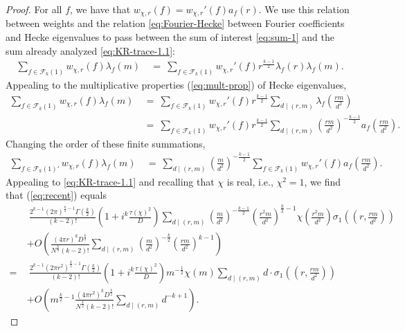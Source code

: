 \documentclass[10pt,a4paper]{amsart}
\begin{document}
\begin{proof}
For all $f$, we have that $w_{\chi,r}(f)=w_{\chi,r}'(f)a_f(r)$. We use this relation between weights and the relation \eqref{eq:Fourier-Hecke} between Fourier coefficients and Hecke eigenvalues to pass between the sum of interest \eqref{eq:sum-1} and the sum already analyzed \eqref{eq:KR-trace-1.1}:
\begin{align}
\sum_{f\in\mathcal{F}_k(1)}w_{\chi,r}(f)\lambda_f(m) \ 
&= \ \sum_{f\in\mathcal{F}_k(1)}w_{\chi,r}'(f)r^{\frac{k-1}{2}}\lambda_f(r)\lambda_f(m).
\end{align}
Appealing to the multiplicative properties (\ref{eq:mult-prop}) of Hecke eigenvalues,
\begin{align}
\sum_{f\in\mathcal{F}_k(1)}w_{\chi,r}(f)\lambda_f(m) \ 
&= \ \sum_{f\in\mathcal{F}_k(1)}w_{\chi,r}'(f)r^{\frac{k-1}{2}}\sum_{d\mid(r,m)}\lambda_f\left(\frac{rm}{d^2}\right) \\
&= \ \sum_{f\in\mathcal{F}_k(1)}w_{\chi,r}'(f)r^{\frac{k-1}{2}}\sum_{d\mid(r,m)}\left(\frac{rm}{d^2}\right)^{-\frac{k-1}{2}}a_f\left(\frac{rm}{d^2}\right).
\end{align}
Changing the order of these finite summations,
\begin{align}
\label{eq:recent}
\sum_{f\in\mathcal{F}_k(1)'}w_{\chi,r}(f)\lambda_f(m) \
&= \ \sum_{d\mid(r,m)} \left(\frac{m}{d^2}\right)^{-\frac{k-1}{2}}\sum_{f\in\mathcal{F}_k(1)}w_{\chi,r}'(f)a_f\left(\frac{rm}{d^2}\right).
\end{align}
Appealing to \eqref{eq:KR-trace-1.1} and recalling that $\chi$ is real, i.e., $\chi^2=1$, we find that (\ref{eq:recent}) equals
\begin{align}
\nonumber
&\ \frac{2^{k-1}(2\pi)^{\frac{k}{2}-1}\Gamma\left(\frac{k}{2}\right)}{(k-2)!}\left(1+i^k\frac{\tau(\chi)^2}{D}\right)\sum_{d\mid(r,m)}\left(\frac{m}{d^2}\right)^{-\frac{k-1}{2}}\left(\frac{r^2m}{d^2}\right)^{\frac{k}{2}-1}\chi\left(\frac{r^2m}{d^2}\right)\sigma_1\left(\left(r,\frac{rm}{d^2}\right)\right)\\
\nonumber
&+O\left(\frac{(4\pi r)^{k}D^{\frac{k}{2}}}{N^{\frac{k}{2}}(k-2)!}\sum_{d\mid(r,m)}\left(\frac{m}{d^2}\right)^{-\frac{k}{2}}\left(\frac{rm}{d^2}\right)^{k-1}\right) \\
\nonumber
= \ & \ \frac{2^{k-1}(2\pi r^2)^{\frac{k}{2}-1}\Gamma\left(\frac{k}{2}\right)}{(k-2)!}\left(1+i^k\frac{\tau(\chi)^2}{D}\right)m^{-\frac{1}{2}}\chi(m)\sum_{d\mid(r,m)}d \cdot \sigma_1\left(\left(r,\frac{rm}{d^2}\right)\right)\\
\label{eq:final-asymp}
&+O\left(m^{\frac{k}{2}-1}\frac{(4\pi r^2)^{k}D^{\frac{k}{2}}}{N^{\frac{k}{2}}(k-2)!}\sum_{d\mid(r,m)}d^{-k+1}\right).

\end{align}
\end{proof}
\end{document}

